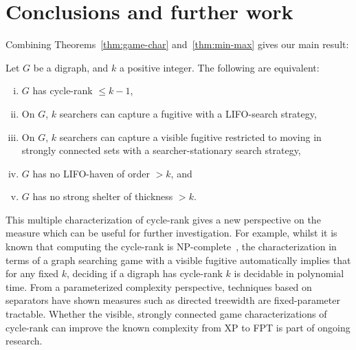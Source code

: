 \documentclass{llncs}
\begin{document}
\section{Conclusions and further work}\label{sec:conc}
Combining Theorems~\ref{thm:game-char} and~\ref{thm:min-max} gives our main result:
\begin{mainthm}
Let $G$ be a digraph, and $k$ a positive integer.  The following are equivalent:
\begin{enumerate}[(i) ]
\item $G$ has cycle-rank $\leq k-1$,
\item On $G$, $k$ searchers can capture a fugitive with a LIFO-search strategy,
\item On $G$, $k$ searchers can capture a visible fugitive restricted to moving in strongly connected sets with a searcher-stationary search strategy, 
\item $G$ has no LIFO-haven of order $> k$, and
\item $G$ has no strong shelter of thickness $>k$.
\end{enumerate}
\end{mainthm}
This multiple characterization of cycle-rank gives a new perspective on the measure which can be useful for further investigation.  For example, whilst it is known that computing the cycle-rank is NP-complete~\cite{Gru08}, the characterization in terms of a graph searching game with a visible fugitive automatically implies that for any fixed $k$, deciding if a digraph has cycle-rank $k$ is decidable in polynomial time.  From a parameterized complexity perspective, techniques based on separators have shown measures such as directed treewidth are fixed-parameter tractable.  Whether the visible, strongly connected game characterizations of cycle-rank can improve the known complexity from XP to FPT is part of ongoing research.
\end{document}
